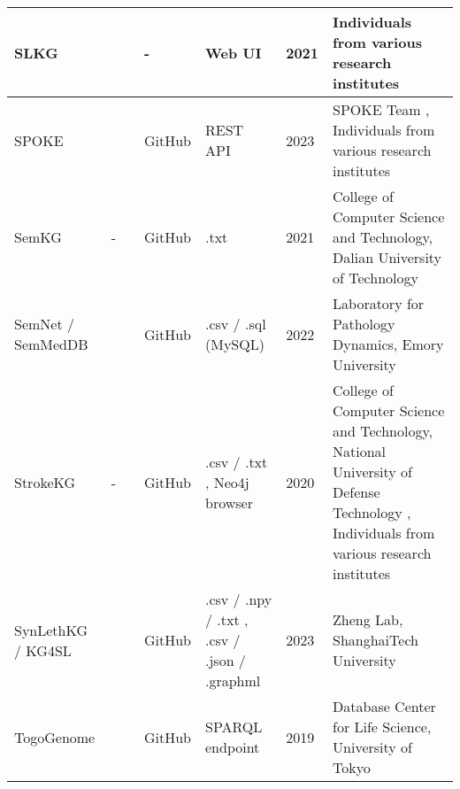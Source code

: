 \documentclass{article}
\begin{document}
\begin{landscape}
\begin{xltabular}{\textwidth}{p{3cm}|p{2.2cm}|p{2.2cm}|p{2.2cm}|p{2.2cm}|p{1cm}|p{6cm}}
\hline


SLKG
&
\cite{slkg_website}
&
\cite{slkg_publication}
&
-
&
Web UI
\cite{slkg_data}
&
2021
&
Individuals from various research institutes
\\


\hline


SPOKE
&
\cite{spoke_website1}
\cite{spoke_website2}
\cite{spoke_website3}
\cite{spoke_website4}
&
\cite{spoke_publication}
&
GitHub
\cite{spoke_github}
&
REST API
\cite{spoke_data}
&
2023
&
SPOKE Team
\cite{spoke_group},
Individuals from various research institutes
\\


\hline


SemKG
&
-
&
\cite{semkg_publication}
&
GitHub
\cite{semkg_github}
&
.txt
\cite{semkg_data}
&
2021
&
College of Computer Science and Technology, Dalian University of Technology
\cite{semkg_group}
\\


\hline


SemNet / SemMedDB
&
\cite{semnet_website}
&
\cite{semnet_publication1}
\cite{semnet_publication2}
&
GitHub
\cite{semnet_github}
&
.csv / .sql (MySQL)
\cite{semnet_data}
&
2022
&
Laboratory for Pathology Dynamics, Emory University
\cite{semnet_group}
\\


\hline


StrokeKG
&
-
&
\cite{strokekg_publication}
&
GitHub
\cite{strokekg_github}
&
.csv / .txt
\cite{strokekg_github},
Neo4j browser
\cite{strokekg_data}
&
2020
&
College of Computer Science and Technology, National University of Defense Technology
\cite{strokekg_group},
Individuals from various research institutes
\\


\hline


SynLethKG /  KG4SL
&
\cite{kg4sl_website2}
&
\cite{kg4sl_publication1}
\cite{kg4sl_publication2}
&
GitHub
\cite{kg4sl_github1}
\cite{kg4sl_github2}
&
.csv / .npy / .txt
\cite{kg4sl_data1},
.csv / .json / .graphml
\cite{kg4sl_data2}
&
2023
&
Zheng Lab, ShanghaiTech University
\cite{kg4sl_group}
\\


\hline


TogoGenome
&
\cite{togogenome_website}
&
\cite{togogenome_publication}
&
GitHub
\cite{togogenome_github}
&
SPARQL endpoint
\cite{togogenome_data}
&
2019
&
Database Center for Life Science, University of Tokyo
\cite{togogenome_group}
\\



\end{xltabular}
\end{landscape}
\end{document}
